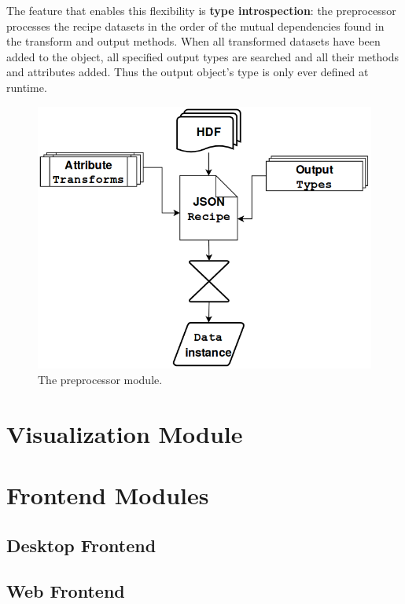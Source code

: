 The feature that enables this flexibility is \textbf{type introspection}: the
preprocessor processes the recipe datasets in the order of the mutual
dependencies found in the transform and output methods. When all transformed
datasets have been added to the object, all specified output types are searched
and all their methods and attributes added. Thus the output object's type is
only ever defined at runtime.  

\begin{figure}[htb!]
    \centering
    \includegraphics[width=0.6\linewidth]{img/reader_flowchart4.png}
    \caption{The preprocessor module.}
    \label{fig:preprocessor}
\end{figure}

\section{Visualization Module}
\label{sec:visualization-module}

\section{Frontend Modules}
\label{sec:frontend-modules}

\subsection{Desktop Frontend}
\label{sec:desktop-frontend}

\subsection{Web Frontend}
\label{sec:web-frontend}






